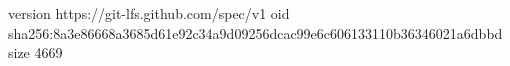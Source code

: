 version https://git-lfs.github.com/spec/v1
oid sha256:8a3e86668a3685d61e92c34a9d09256dcac99e6c606133110b36346021a6dbbd
size 4669
